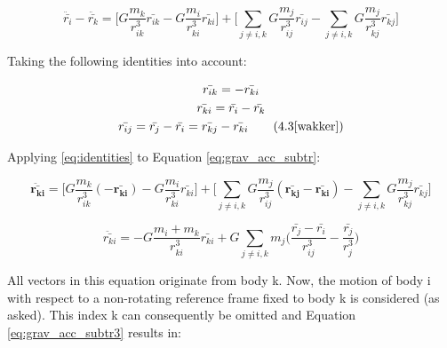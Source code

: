\begin{equation}
    \ddot{\bar{r_{i}}} - \ddot{\bar{r_{k}}} = \Bigg[ G \frac{m_{k}}{r_{ik}^3} \bar{r_{ik}} - G \frac{m_{i}}{r_{ki}^3} \bar{r_{ki}} \Bigg] + \Bigg[ \sum_{j \neq i,k}^{} G \frac{m_{j}}{r_{ij}^3} \bar{r_{ij}} -\sum_{j \neq i,k}^{} G \frac{m_{j}}{r_{kj}^3} \bar{r_{kj}} \Bigg]
    \label{eq:grav_acc_subtr}
\end{equation}

\noindent Taking the following identities into account:

\begin{gather*}
    \bar{r_{ik}} = -\bar{r_{ki}}\\
    \bar{r_{ki}} = \bar{r_{i}} - \bar{r_{k}}\\
    \bar{r_{ij}} = \bar{r_{j}} - \bar{r_{i}} = \bar{r_{kj}} - \bar{r_{ki}}
    \tag{4.3\cite{wakker}}
    \label{eq:identities}
\end{gather*}

\noindent Applying \ref{eq:identities} to Equation \ref{eq:grav_acc_subtr}:

\begin{equation*}
    \boldsymbol{\ddot{\bar{r_{ki}}}} = \Bigg[ G \frac{m_{k}}{r_{ik}^3} (\boldsymbol{-\bar{r_{ki}}}) - G \frac{m_{i}}{r_{ki}^3} \bar{r_{ki}} \Bigg] + \Bigg[ \sum_{j \neq i,k}^{} G \frac{m_{j}}{r_{ij}^3} (\boldsymbol{\bar{r_{kj}} - \bar{r_{ki}}}) -\sum_{j \neq i,k}^{} G \frac{m_{j}}{r_{kj}^3} \bar{r_{kj}} \Bigg]
    \label{eq:grav_acc_subtr2}
\end{equation*}

\begin{equation}
    \ddot{\bar{r_{ki}}} = -G \frac{m_{i} + m_{k}}{r_{ki}^3} \bar{r_{ki}} + G\sum_{j \neq i,k}^{} m_{j} \Bigg( \frac{\bar{r_{j}} - \bar{r_{i}}}{r_{ij}^3} - \frac{\bar{r_{j}}}{r_{j}^3} \Bigg)
    \label{eq:grav_acc_subtr3}
\end{equation}

\noindent All vectors in this equation originate from body k. Now, the motion of body i with respect to a non-rotating reference frame fixed to body k is considered (as asked). This index k can consequently be omitted and Equation \ref{eq:grav_acc_subtr3} results in:

